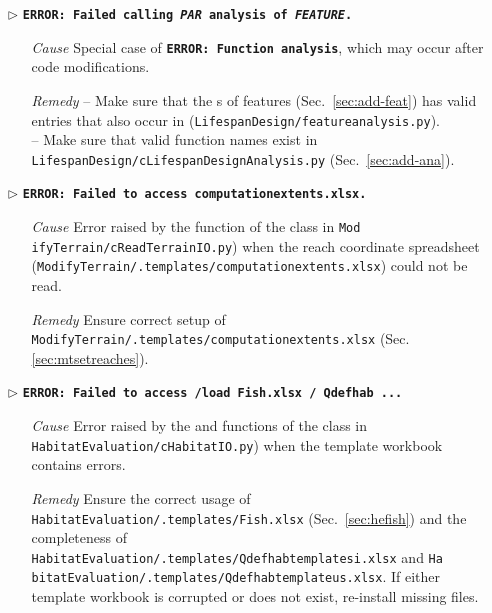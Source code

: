 \begin{itemize}
	\item[$\triangleright$]\textbf{\texttt{ERROR: Failed calling \textit{PAR} analysis of \textit{FEATURE}.}}
	\begin{itemize}
		\item[\textit{Cause}\hspace{0.27cm}] Special case of \textbf{\texttt{ERROR: Function analysis}}, which may occur after code modifications.
		\item[\textit{Remedy}] -- Make sure that the s of features (Sec.~\ref{sec:add-feat}) has valid entries that also occur in  (\texttt{LifespanDesign/feature{\myUnderscore}analysis.py}).\\
								 -- Make sure that valid function names exist in \texttt{LifespanDesign/cLifespanDesignAnalysis.py} (Sec.~\ref{sec:add-ana}).\\
	\end{itemize}
	
	\item[$\triangleright$]\textbf{\texttt{ERROR: Failed to access computation{\myUnderscore}extents.xlsx.}}
	\begin{itemize}
		\item[\textit{Cause}\hspace{0.27cm}] Error raised by the  function of the  class in \texttt{Mod ifyTerrain/cReadTerrainIO.py}) when the reach coordinate spreadsheet (\texttt{ModifyTerrain/.templates/computation{\myUnderscore}extents.xlsx}) could not be read.
		\item[\textit{Remedy}] Ensure correct setup of \texttt{ModifyTerrain/.templates/computation{\myUnderscore}extents.xlsx} (Sec. \ref{sec:mtsetreaches}).\\
	\end{itemize}
	
	\item[$\triangleright$]\textbf{\texttt{ERROR: Failed to access /load  Fish.xlsx / Q{\myUnderscore}def{\myUnderscore}hab ...}}
	\begin{itemize}
		\item[\textit{Cause}\hspace{0.27cm}] Error raised by the  and  functions of the  class in \texttt{HabitatEvaluation/cHabitatIO.py}) when the template workbook contains errors.
		\item[\textit{Remedy}] Ensure the correct usage of \texttt{HabitatEvaluation/.templates/Fish.xlsx} (Sec.~\ref{sec:hefish}) and the completeness of \texttt{HabitatEvaluation/.templates/Q{\myUnderscore}def{\myUnderscore}hab{\myUnderscore}template{\myUnderscore}si.xlsx} and \texttt{Ha bitatEvaluation/.templates/Q{\myUnderscore}def{\myUnderscore}hab{\myUnderscore}template{\myUnderscore}us.xlsx}. If either template workbook is corrupted or does not exist, re-install missing files.\\
	\end{itemize}
	

\end{itemize}
